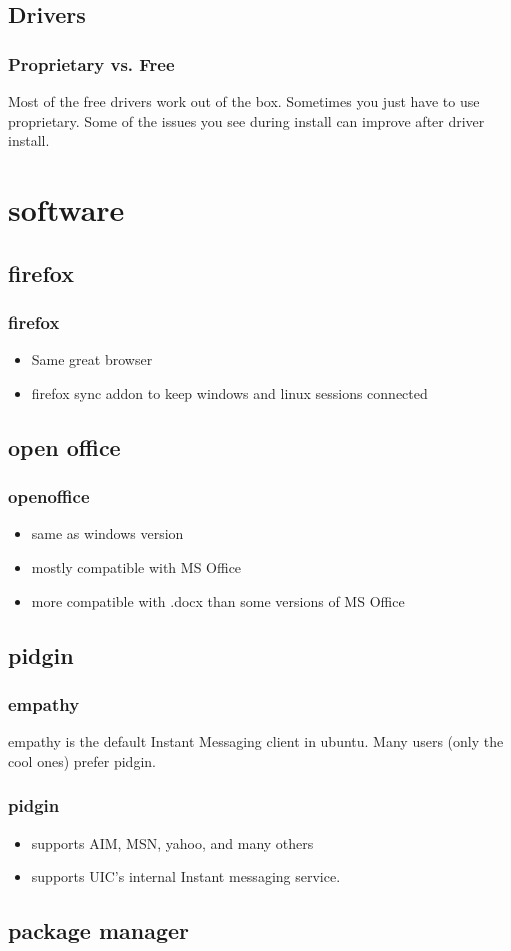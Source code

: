\documentclass[hyperref={pdfpagelabels=false}]{beamer}
\begin{document}
\subsection{Drivers}
\frame
{
	\frametitle{Proprietary vs. Free}
	Most of the free drivers work out of the box. Sometimes you just have to
use proprietary. Some of the issues you see during install can improve after driver install.
\section{software}
\subsection{firefox}
\frame
{
    \frametitle{firefox}
    \begin{itemize}
    \item{Same great browser}
    \item{firefox sync addon to keep windows and linux sessions connected}
    \end{itemize}
}
\subsection{open office}
\frame
{
    \frametitle{openoffice}
    \begin{itemize}
    \item{same as windows version}
    \item{mostly compatible with MS Office}
    \item{more compatible with .docx than some versions of MS Office}
    \end{itemize}
}
\subsection{pidgin}
\frame
{
	\frametitle{empathy}
	empathy is the default Instant Messaging client in ubuntu.
        Many users (only the cool ones) prefer pidgin.
}
\frame
{
	\frametitle{pidgin}
	\begin{itemize}
	\item{supports AIM, MSN, yahoo, and many others}
	\item{supports UIC's internal Instant messaging service.}
	\end{itemize}
}
\subsection{package manager}
\frame
{
	\frametitle{ }


}}
\end{document}
